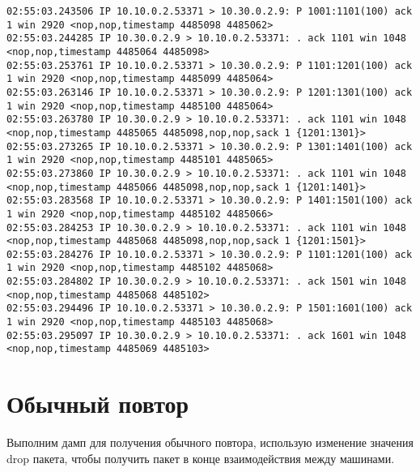 \documentclass[a4paper,12pt]{article}
\begin{document}
\begin{Verbatim}
02:55:03.243506 IP 10.10.0.2.53371 > 10.30.0.2.9: P 1001:1101(100) ack 1 win 2920 <nop,nop,timestamp 4485098 4485062>
02:55:03.244285 IP 10.30.0.2.9 > 10.10.0.2.53371: . ack 1101 win 1048 <nop,nop,timestamp 4485064 4485098>
02:55:03.253761 IP 10.10.0.2.53371 > 10.30.0.2.9: P 1101:1201(100) ack 1 win 2920 <nop,nop,timestamp 4485099 4485064>
02:55:03.263146 IP 10.10.0.2.53371 > 10.30.0.2.9: P 1201:1301(100) ack 1 win 2920 <nop,nop,timestamp 4485100 4485064>
02:55:03.263780 IP 10.30.0.2.9 > 10.10.0.2.53371: . ack 1101 win 1048 <nop,nop,timestamp 4485065 4485098,nop,nop,sack 1 {1201:1301}>
02:55:03.273265 IP 10.10.0.2.53371 > 10.30.0.2.9: P 1301:1401(100) ack 1 win 2920 <nop,nop,timestamp 4485101 4485065>
02:55:03.273860 IP 10.30.0.2.9 > 10.10.0.2.53371: . ack 1101 win 1048 <nop,nop,timestamp 4485066 4485098,nop,nop,sack 1 {1201:1401}>
02:55:03.283568 IP 10.10.0.2.53371 > 10.30.0.2.9: P 1401:1501(100) ack 1 win 2920 <nop,nop,timestamp 4485102 4485066>
02:55:03.284253 IP 10.30.0.2.9 > 10.10.0.2.53371: . ack 1101 win 1048 <nop,nop,timestamp 4485068 4485098,nop,nop,sack 1 {1201:1501}>
02:55:03.284276 IP 10.10.0.2.53371 > 10.30.0.2.9: P 1101:1201(100) ack 1 win 2920 <nop,nop,timestamp 4485102 4485068>
02:55:03.284802 IP 10.30.0.2.9 > 10.10.0.2.53371: . ack 1501 win 1048 <nop,nop,timestamp 4485068 4485102>
02:55:03.294496 IP 10.10.0.2.53371 > 10.30.0.2.9: P 1501:1601(100) ack 1 win 2920 <nop,nop,timestamp 4485103 4485068>
02:55:03.295097 IP 10.30.0.2.9 > 10.10.0.2.53371: . ack 1601 win 1048 <nop,nop,timestamp 4485069 4485103>

\end{Verbatim}

\section{Обычный повтор}

Выполним дамп для получения обычного повтора, использую изменение значения drop пакета, чтобы получить пакет в конце взаимодействия между машинами.
\end{document}
